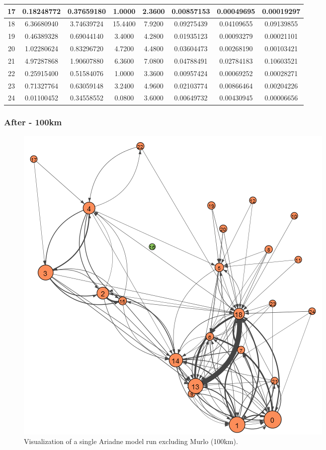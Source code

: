 \documentclass[12pt,a4paper]{thesis}
\begin{document}
\begin{table}[H]
\begin{tabular}{|c|c|c|c|c|c|c|c|}
\hline	17	&	0.18248772	&	0.37659180	&	1.0000	&	2.3600	&	0.00857153	&	0.00049695	&	0.00019297	\\
\hline	18	&	6.36680940	&	3.74639724	&	15.4400	&	7.9200	&	0.09275439	&	0.04109655	&	0.09139855	\\
\hline	19	&	0.46389328	&	0.69044140	&	3.4000	&	4.2800	&	0.01935123	&	0.00093279	&	0.00021101	\\
\hline	20	&	1.02280624	&	0.83296720	&	4.7200	&	4.4800	&	0.03604473	&	0.00268190	&	0.00103421	\\
\hline	21	&	4.97287868	&	1.90607880	&	6.3600	&	7.0800	&	0.04788491	&	0.02784183	&	0.10603521	\\
\hline	22	&	0.25915400	&	0.51584076	&	1.0000	&	3.3600	&	0.00957424	&	0.00069252	&	0.00028271	\\
\hline	23	&	0.71327764	&	0.63059148	&	3.2400	&	4.9600	&	0.02103774	&	0.00866464	&	0.00204226	\\
\hline	24	&	0.01100452	&	0.34558552	&	0.0800	&	3.6000	&	0.00649732	&	0.00430945	&	0.00006656	\\
\hline 
\end{tabular} 
\label{tab:ariadneNodeAfter60}
\end{table}

\subsubsection{After - 100km}

\begin{figure}[H]
\centering
\includegraphics[width=0.9\linewidth]{./AfterViz/ariadne100}
\caption{Visualization of a single Ariadne model run excluding Murlo (100km).}
\label{fig:ariadneA100}
\end{figure}
\end{document}
